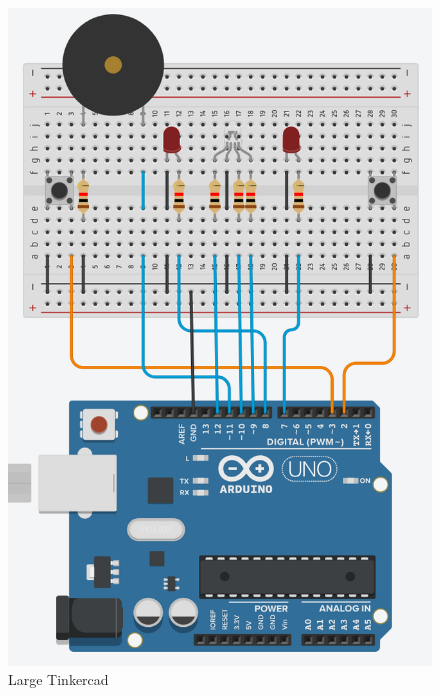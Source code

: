 \documentclass[journal]{IEEEtran}
\begin{document}
\begin{landscape}
    \begin{figure}[h]%
        \begin {center}
        \includegraphics[width=\textwidth, angle=90]{images/tinkercad.PNG}
        \caption{Large Tinkercad}
        \label{fig:tinkercadLarge}
        \end {center}
    \end{figure}

\end{landscape}
\end{document}
